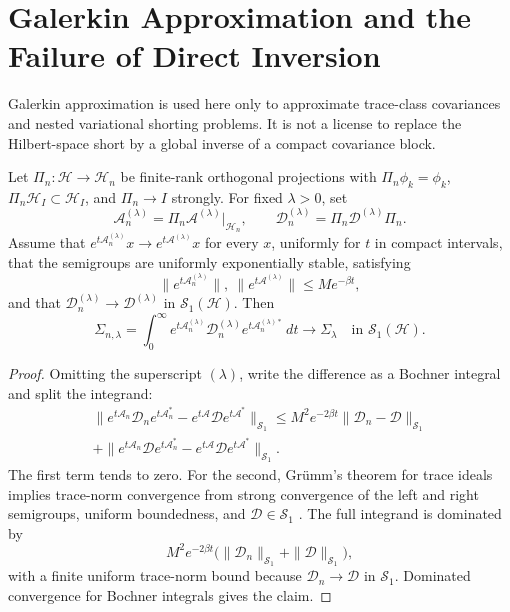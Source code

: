 \section{Galerkin Approximation and the Failure of Direct Inversion}
\label{app:galerkin_shorting}

Galerkin approximation is used here only to approximate trace-class covariances
and nested variational shorting problems.  It is not a license to replace the
Hilbert-space short by a global inverse of a compact covariance block.

\begin{lemma}
\label{lem:galerkin_trace_norm}
Let $\Pi_n:\mathcal{H}\to\mathcal{H}_n$ be finite-rank orthogonal projections
with $\Pi_n\phi_k=\phi_k$, $\Pi_n\mathcal{H}_I\subset\mathcal{H}_I$, and
$\Pi_n\to I$ strongly.  For fixed $\lambda>0$, set
\[
  \mathcal{A}_n^{(\lambda)}
  =\Pi_n\mathcal{A}^{(\lambda)}|_{\mathcal{H}_n},
  \qquad
  \mathcal{D}_n^{(\lambda)}
  =\Pi_n\mathcal{D}^{(\lambda)}\Pi_n .
\]
Assume that $e^{t\mathcal{A}_n^{(\lambda)}}x\to
e^{t\mathcal{A}^{(\lambda)}}x$ for every $x$, uniformly for $t$ in compact
intervals, that the semigroups are uniformly exponentially stable, satisfying
\[
  \|e^{t\mathcal{A}_n^{(\lambda)}}\|,\
  \|e^{t\mathcal{A}^{(\lambda)}}\|\le Me^{-\beta t},
\]
and that $\mathcal{D}_n^{(\lambda)}\to\mathcal{D}^{(\lambda)}$ in
$\mathcal{S}_1(\mathcal{H})$.  Then
\[
  \Sigma_{n,\lambda}
  =
  \int_0^\infty
  e^{t\mathcal{A}_n^{(\lambda)}}
  \mathcal{D}_n^{(\lambda)}
  e^{t\mathcal{A}_n^{(\lambda)*}}\,dt
  \longrightarrow
  \Sigma_\lambda
  \quad\text{in }\mathcal{S}_1(\mathcal{H}).
\]
\end{lemma}

\begin{proof}
Omitting the superscript $(\lambda)$, write the difference as a Bochner
integral and split the integrand:
\begin{multline*}
  \|e^{t\mathcal{A}_n}\mathcal{D}_ne^{t\mathcal{A}_n^*}
    -e^{t\mathcal{A}}\mathcal{D}e^{t\mathcal{A}^*}\|_{\mathcal{S}_1}
  \le
  M^2e^{-2\beta t}\|\mathcal{D}_n-\mathcal{D}\|_{\mathcal{S}_1}\\
  +
  \|e^{t\mathcal{A}_n}\mathcal{D}e^{t\mathcal{A}_n^*}
    -e^{t\mathcal{A}}\mathcal{D}e^{t\mathcal{A}^*}\|_{\mathcal{S}_1}.
\end{multline*}
The first term tends to zero.  For the second, Gr\"umm's theorem for trace
ideals implies trace-norm convergence from strong convergence of the left and
right semigroups, uniform boundedness, and $\mathcal{D}\in\mathcal{S}_1$
\cite{simon2005trace,daprato2014stochastic}.  The full integrand is dominated by
\[
  M^2e^{-2\beta t}
  \bigl(\|\mathcal{D}_n\|_{\mathcal{S}_1}
        +\|\mathcal{D}\|_{\mathcal{S}_1}\bigr),
\]
with a finite uniform trace-norm bound because
$\mathcal{D}_n\to\mathcal{D}$ in $\mathcal{S}_1$.  Dominated convergence for
Bochner integrals gives the claim.
\end{proof}

